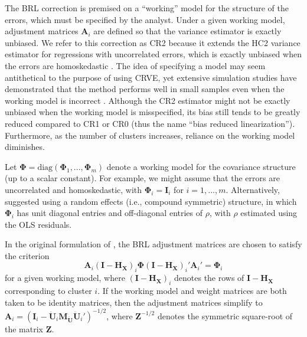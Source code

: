 \documentclass[12pt]{article}\usepackage[]{graphicx}\usepackage[]{color}
\newcommand{\bm}{\mathbf}
\newcommand{\bs}{\boldsymbol}
\begin{document}
The BRL correction is premised on a ``working'' model for the structure of the errors, which must be specified by the analyst. 
Under a given working model, adjustment matrices $\bm{A}_i$ are defined so that the variance estimator is exactly unbiased.
We refer to this correction as CR2 because it extends the HC2 variance estimator for regressions with uncorrelated errors, which is exactly unbiased when the errors are homoskedastic \citep{MacKinnon1985some}.
The idea of specifying a model may seem antithetical to the purpose of using CRVE, yet extensive simulation studies have demonstrated that the method performs well in small samples even when the working model is incorrect \citep[][]{Bell2002bias, Cameron2015practitioners, Imbens2015robust}. 
Although the CR2 estimator might not be exactly unbiased when the working model is misspecified, its bias still tends to be greatly reduced compared to CR1 or CR0 (thus the name ``bias reduced linearization''). Furthermore, as the number of clusters increases, reliance on the working model diminishes. 

Let $\bs\Phi = \text{diag}\left(\bs\Phi_1,...,\bs\Phi_m\right)$ denote a working model for the covariance structure (up to a scalar constant). 
For example, we might assume that the errors are uncorrelated and homoskedastic, with $\bs\Phi_i = \bm{I}_i$ for $i = 1,...,m$. 
Alternatively, \citet{Imbens2015robust} suggested using a random effects (i.e., compound symmetric) structure, in which $\bs\Phi_i$ has unit diagonal entries and off-diagonal entries of $\rho$, with $\rho$ estimated using the OLS residuals.

In the original formulation of \citet{Bell2002bias}, the BRL adjustment matrices are chosen to satisfy the criterion
\begin{equation}
\label{eq:CR2_criterion_BM}
\bm{A}_i \left(\bm{I} - \bm{H_X}\right)_i \bs\Phi \left(\bm{I} - \bm{H_X}\right)_i' \bm{A}_i'  =  \bs\Phi_i 
\end{equation}
for a given working model, where $\left(\bm{I} - \bm{H_X}\right)_i$ denotes the rows of $\bm{I} - \bm{H_X}$ corresponding to cluster $i$.
If the working model and weight matrices are both taken to be identity matrices, then the adjustment matrices simplify to $\bm{A}_i =  \left(\bm{I}_i - \bm{\ddot{U}}_i \bm{M_{\ddot{U}}} \bm{\ddot{U}}_i'\right)^{-1/2}$, where $\bm{Z}^{-1/2}$ denotes the symmetric square-root of the matrix $\bm{Z}$. 
\end{document}
